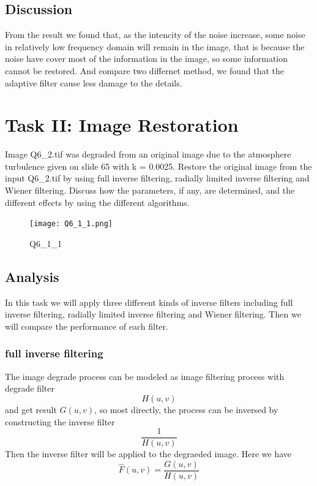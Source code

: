 \documentclass[
	12pt, %
]{style/fphw}
\begin{document}
	\subsection*{Discussion}

	From the result we found that, as the intencity of the noise increase, some noise in relatively low frequency domain will remain in the image, that is because the noise have cover most of the information in the image, so some information cannot be restored. And compare two differnet method, we found that the adaptive filter cause less damage to the details.
	

\section*{Task II: Image Restoration}

\begin{problem}
	Image Q6\_2.tif was degraded from an original image due to the atmosphere turbulence given on slide 65 with k = 0.0025. Restore the original image from the input Q6\_2.tif by using full inverse filtering, radially limited inverse filtering and Wiener filtering. Discuss how the parameters, if any, are determined, and the different effects by using the different algorithms.

	\begin{figure}[H]
		\centering
	    \texttt{[image: Q6\_1\_1.png]}
	    \caption{Q6\_1\_1}
	    \label{Q6_1_1}
	\end{figure}
\end{problem}

\subsection*{Analysis}

In this task we will apply three different kinds of inverse filters including full inverse filtering, radially limited inverse filtering and Wiener filtering. Then we will compare the performance of each filter. 

\subsubsection*{full inverse filtering}

The image degrade process can be modeled as image filtering process with degrade filter $$H(u, v)$$ and get result $G(u, v)$, so most directly, the process can be inversed by constructing the inverse filter $$\frac{1}{H(u, v)}$$ Then the inverse filter will be applied to the degraeded image. Here we have $$\widehat{F}(u, v) = \frac{G(u, v)}{H(u, v)}$$ 
\end{document}

